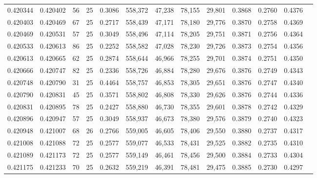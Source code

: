\begin{tabular}{rrrrrrrrrrrrr}
0.420344 & 0.420402 &    56 &  25 &                                     0.3086 & 558,372 &  47,238 &  78,155 &  29,801 & 0.3868 & 0.2760 & 0.4376 \\
0.420403 & 0.420469 &    67 &  25 &                                     0.2717 & 558,439 &  47,171 &  78,180 &  29,776 & 0.3870 & 0.2758 & 0.4369 \\
0.420469 & 0.420531 &    57 &  25 &                                     0.3049 & 558,496 &  47,114 &  78,205 &  29,751 & 0.3871 & 0.2756 & 0.4364 \\
0.420533 & 0.420613 &    86 &  25 &                                     0.2252 & 558,582 &  47,028 &  78,230 &  29,726 & 0.3873 & 0.2754 & 0.4356 \\
0.420613 & 0.420665 &    62 &  25 &                                     0.2874 & 558,644 &  46,966 &  78,255 &  29,701 & 0.3874 & 0.2751 & 0.4350 \\
0.420666 & 0.420747 &    82 &  25 &                                     0.2336 & 558,726 &  46,884 &  78,280 &  29,676 & 0.3876 & 0.2749 & 0.4343 \\
0.420748 & 0.420790 &    31 &  25 &                                     0.4464 & 558,757 &  46,853 &  78,305 &  29,651 & 0.3876 & 0.2747 & 0.4340 \\
0.420790 & 0.420831 &    45 &  25 &                                     0.3571 & 558,802 &  46,808 &  78,330 &  29,626 & 0.3876 & 0.2744 & 0.4336 \\
0.420831 & 0.420895 &    78 &  25 &                                     0.2427 & 558,880 &  46,730 &  78,355 &  29,601 & 0.3878 & 0.2742 & 0.4329 \\
0.420896 & 0.420947 &    57 &  25 &                                     0.3049 & 558,937 &  46,673 &  78,380 &  29,576 & 0.3879 & 0.2740 & 0.4323 \\
0.420948 & 0.421007 &    68 &  26 &                                     0.2766 & 559,005 &  46,605 &  78,406 &  29,550 & 0.3880 & 0.2737 & 0.4317 \\
0.421008 & 0.421088 &    72 &  25 &                                     0.2577 & 559,077 &  46,533 &  78,431 &  29,525 & 0.3882 & 0.2735 & 0.4310 \\
0.421089 & 0.421173 &    72 &  25 &                                     0.2577 & 559,149 &  46,461 &  78,456 &  29,500 & 0.3884 & 0.2733 & 0.4304 \\
0.421175 & 0.421233 &    70 &  25 &                                     0.2632 & 559,219 &  46,391 &  78,481 &  29,475 & 0.3885 & 0.2730 & 0.4297 \\

\end{tabular}

